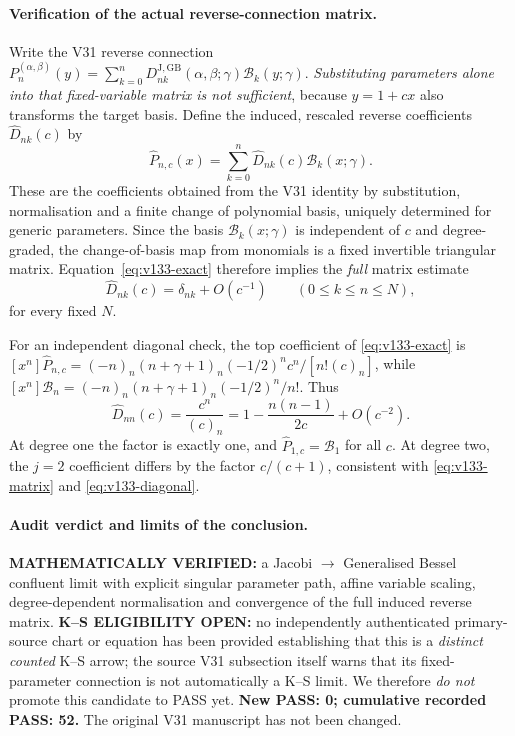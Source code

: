 \documentclass[11pt]{article}
\begin{document}
\paragraph{Verification of the actual reverse-connection matrix.}
Write the V31 reverse connection
$P_n^{(\alpha,\beta)}(y)=\sum_{k=0}^n
D_{nk}^{\mathrm{J,GB}}(\alpha,\beta;\gamma)\mathcal{B}_k(y;\gamma)$.
\emph{Substituting parameters alone into that fixed-variable matrix is not
sufficient}, because $y=1+cx$ also transforms the target basis.
Define the induced, rescaled reverse coefficients $\widehat D_{nk}(c)$ by
\begin{equation}\label{eq:v133-induced}
 \widehat P_{n,c}(x)=\sum_{k=0}^n
 \widehat D_{nk}(c)\mathcal{B}_k(x;\gamma).
\end{equation}
These are the coefficients obtained from the V31 identity by substitution,
normalisation and a finite change of polynomial basis, uniquely determined
for generic parameters.  Since the basis $\mathcal{B}_k(x;\gamma)$ is independent
of $c$ and degree-graded, the change-of-basis map from monomials is a fixed
invertible triangular matrix. Equation~\eqref{eq:v133-exact} therefore
implies the \emph{full} matrix estimate
\begin{equation}\label{eq:v133-matrix}
 \boxed{\widehat D_{nk}(c)=\delta_{nk}+O(c^{-1})
 \qquad(0\le k\le n\le N),}
\end{equation}
for every fixed $N$.

For an independent diagonal check, the top coefficient of
\eqref{eq:v133-exact} is
$[x^n]\widehat P_{n,c}=(-n)_n(n+\gamma+1)_n(-1/2)^n c^n/[n!(c)_n]$,
while $[x^n]\mathcal{B}_n=(-n)_n(n+\gamma+1)_n(-1/2)^n/n!$.
Thus
\begin{equation}\label{eq:v133-diagonal}
 \boxed{\widehat D_{nn}(c)=\frac{c^n}{(c)_n}
 =1-\frac{n(n-1)}{2c}+O(c^{-2}).}
\end{equation}
At degree one the factor is exactly one, and
$\widehat P_{1,c}=\mathcal{B}_1$ for all $c$. At degree two, the $j=2$
coefficient differs by the factor $c/(c+1)$, consistent with
\eqref{eq:v133-matrix} and \eqref{eq:v133-diagonal}.

\paragraph{Audit verdict and limits of the conclusion.}
\textbf{MATHEMATICALLY VERIFIED:} a Jacobi $\to$ Generalised Bessel
confluent limit with explicit singular parameter path, affine variable
scaling, degree-dependent normalisation and convergence of the full induced
reverse matrix. \textbf{K--S ELIGIBILITY OPEN:} no independently authenticated
primary-source chart or equation has been provided establishing that this
is a \emph{distinct counted} K--S arrow; the source V31 subsection itself
warns that its fixed-parameter connection is not automatically a K--S
limit. We therefore \emph{do not} promote this candidate to PASS yet.
\textbf{New PASS: 0; cumulative recorded PASS: 52.} The original V31
manuscript has not been changed.
\end{document}
